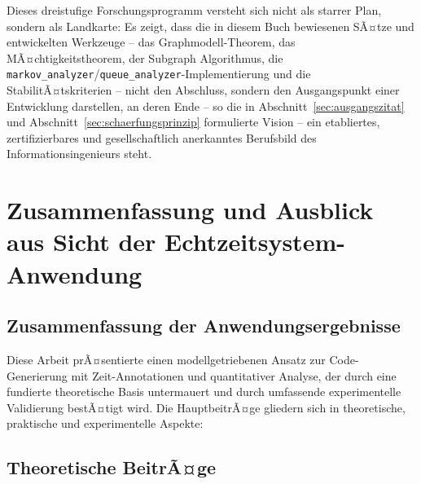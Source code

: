 ﻿\documentclass[a4paper,12pt]{report}
\theoremstyle{definition}
\begin{document}
\noindent
Dieses dreistufige Forschungsprogramm versteht sich nicht als starrer Plan,
sondern als Landkarte: Es zeigt, dass die in diesem Buch bewiesenen SÃ¤tze
und entwickelten Werkzeuge -- das Graphmodell-Theorem, das
MÃ¤chtigkeitstheorem, der Subgraph Algorithmus, die
\texttt{markov\_analyzer}/\texttt{queue\_analyzer}-Implementierung und die
StabilitÃ¤tskriterien -- nicht den Abschluss, sondern den Ausgangspunkt
einer Entwicklung darstellen, an deren Ende -- so die in
Abschnitt~\ref{sec:ausgangszitat} und Abschnitt~\ref{sec:schaerfungsprinzip}
formulierte Vision -- ein etabliertes, zertifizierbares und gesellschaftlich
anerkanntes Berufsbild des Informationsingenieurs steht.

\section{Zusammenfassung und Ausblick aus Sicht der Echtzeitsystem-Anwendung}
\label{sec:zusammenfassung-anwendung}

\subsection{Zusammenfassung der Anwendungsergebnisse}

Diese Arbeit prÃ¤sentierte einen modellgetriebenen Ansatz zur Code-Generierung mit Zeit-Annotationen und quantitativer Analyse, der durch eine fundierte theoretische Basis untermauert und durch umfassende experimentelle Validierung bestÃ¤tigt wird. Die HauptbeitrÃ¤ge gliedern sich in theoretische, praktische und experimentelle Aspekte:

\subsection{Theoretische BeitrÃ¤ge}
\end{document}

